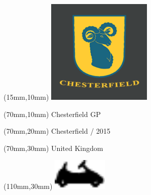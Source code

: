 \null\newpage
\begin{textblock*}{50mm}(15mm,10mm)%
\includegraphics[width=50mm]{LG/2015-06-23_00001.png}
\end{textblock*}
\begin{textblock*}{130mm}(70mm,10mm)%
{\fontsize{20}{20}\selectfont Chesterfield GP}\\
\end{textblock*}
\begin{textblock*}{120mm}(70mm,20mm)%
{\fontsize{16}{16}\selectfont Chesterfield / 2015}\\
\end{textblock*}
\begin{textblock*}{120mm}(70mm,30mm)%
{\fontsize{12}{12}\selectfont United Kingdom}
\end{textblock*}
\begin{textblock*}{30mm}(110mm,30mm)%
\centering
\includegraphics[height=15mm]{icons/kart.pdf}
\end{textblock*}
